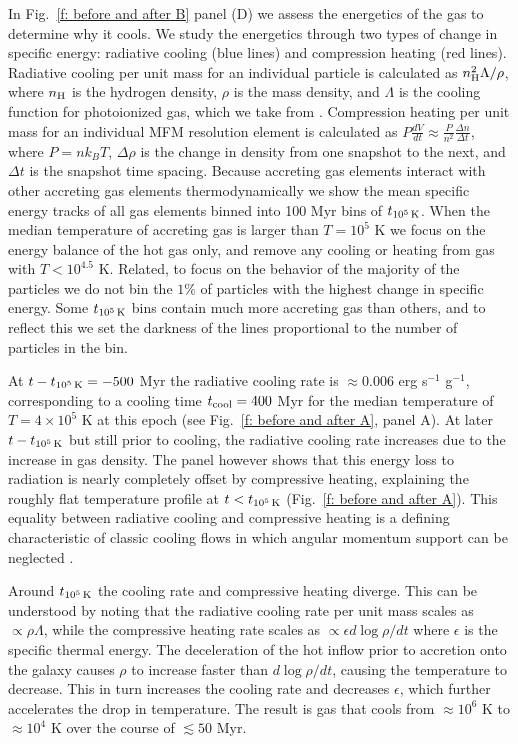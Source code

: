 \documentclass[fleqn,usenatbib]{mnras}
\newcommand{\tcools}{t_{10^5\,{\rm K}}}
\newcommand{\nH}{n_{\rm H}}
\begin{document}
In Fig.~\ref{f: before and after B} panel (D) we assess the energetics of the gas to determine why it cools.
We study the energetics through two types of change in specific energy: radiative cooling (blue lines) and compression heating (red lines).
Radiative cooling per unit mass for an individual particle is calculated as $\nH^2 \Lambda / \rho$, where $\nH$ is the hydrogen density, $\rho$ is the mass density, and $\Lambda$ is the cooling function for photoionized gas, which we take from \cite{Wiersma2009a}.
Compression heating per unit mass for an individual MFM resolution element is calculated as $P \frac{dV}{dt} \approx \frac{ P }{ n^2 } \frac{ \Delta n }{ \Delta t }$, where $P = n k_B T$, $\Delta \rho$ is the change in density from one snapshot to the next, and $\Delta t$ is the snapshot time spacing.
Because accreting gas elements interact with other accreting gas elements thermodynamically we show the mean specific energy tracks of all gas elements binned into 100 Myr bins of $\tcools$.
When the median temperature of accreting gas is larger than $T=10^5$ K we focus on the energy balance of the hot gas only, and remove any cooling or heating from gas with $T < 10^{4.5}$ K.
Related, to focus on the behavior of the majority of the particles we do not bin the $1\%$ of particles with the highest change in specific energy.
Some $\tcools$ bins contain much more accreting gas than others, and to reflect this we set the darkness of the lines proportional to the number of particles in the bin.

At $t-\tcools=-500$ Myr the radiative cooling rate is $\approx0.006$ erg s$^{-1}$ g$^{-1}$, corresponding to a cooling time $t_{\rm cool}=400$ Myr for the median temperature of $T=4\times 10^5$ K at this epoch (see Fig.~\ref{f: before and after A}, panel A). 
At later $t-\tcools$ but still prior to cooling, the radiative cooling rate increases due to the increase in gas density.
The panel however shows that this energy loss to radiation is nearly completely offset by compressive heating, explaining the roughly flat temperature profile at $t<\tcools$ (Fig.~\ref{f: before and after A}). 
This equality between radiative cooling and compressive heating is a defining characteristic of classic cooling flows in which angular momentum support can be neglected \citep{Mathews1978, McNamara2007, Stern2019}. 

Around $\tcools$ the cooling rate and compressive heating diverge.
This can be understood by noting that the radiative cooling rate per unit mass scales as $\propto\rho\Lambda$, while the compressive heating rate scales as $\propto\epsilon d\log\rho/d t$ where $\epsilon$ is the specific thermal energy.
The deceleration of the hot inflow prior to accretion onto the galaxy causes $\rho$ to increase faster than $d\log\rho/d t$, causing the temperature to decrease.
This in turn increases the cooling rate and decreases $\epsilon$, which further accelerates the drop in temperature.
The result is gas that cools from $\approx10^6$ K to $\approx10^4$ K over the course of $\lesssim 50$ Myr.
\end{document}

